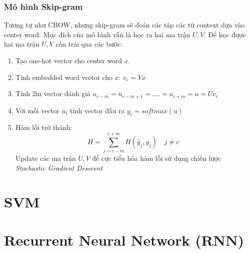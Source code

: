 \documentclass[a4paper,12pt]{report}
\begin{document}
\subsubsection{Mô hình Skip-gram}
Tương tự như CBOW, nhưng skip-gram sẽ đoán các tập các từ context dựa vào center word. Mục đích của mô hình vẫn là học ra hai ma trận $U, V$. Để học được hai ma trận $U, V$ cần trải qua các bước:
\begin{enumerate}
\item Tạo one-hot vector cho center word $x$.
\item Tính embedded word vector cho $x$: $v_c = Vx$
\item Tính 2m vector đánh giá $u_{c-m} = u_{c-m+1} = .... = u_{c+m} = u = Uv_c$
\item Với mỗi vector $u_i$ tính vector đầu ra $y_i = softmax(u)$
\item Hàm lỗi trở thành:
$$H = \sum_{j=c-m}^{c+m} H(\hat{y}_j,y_j) \quad j \neq c$$
Update các ma trận $U, V$ để cực tiểu hóa hàm lỗi sử dụng chiến lược \emph{Stochastic Gradient Desecent}


\end{enumerate} 

\section{SVM}

\section{Recurrent Neural Network (RNN)}
\end{document}
